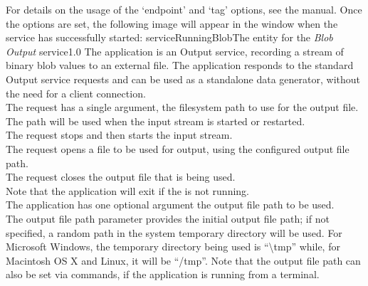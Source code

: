 For details on the usage of the `endpoint' and `tag' options, see the \emph{\CMU} manual.
Once the options are set, the following image will appear in the \emph{\CMU} window when
the service has successfully started:
%
{serviceRunningBlob}{The \emph{\CMU} entity for the \emph{Blob Output} service}{1.0}
\condPage
{}
The  application is an Output service, recording
a stream of \yarp{} binary blob values to an external file.
The application responds to the standard Output service requests and can be used as a
standalone data generator, without the need for a client connection.\\

The  request has a single argument,
the file\longDash{}system path to use for the output file.
The path will be used when the input stream is started or restarted.\\

The  request stops and then
starts the input stream.\\

The  request opens a file to be
used for output, using the configured output file path.\\

The  request closes the output
file that is being used.\\

Note that the application will exit if the  is not
running.\\

The application has one optional argument \longDash{} the output file path to be used.
\insertAppParameters
{}
\insertOutputServiceComment\\

The output file path parameter provides the initial output file path; if not specified, a
random path in the system temporary directory will be used.
For Microsoft Windows, the temporary directory being used is ``\textbackslash{}tmp''
while, for Macintosh OS X and Linux, it will be ``/tmp''.
Note that the output file path can also be set via commands, if the application is
running from a terminal.\\

